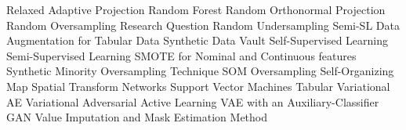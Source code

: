 {{\begin{acronym}
              {Relaxed Adaptive Projection}
               {Random Forest}
              {Random Orthonormal Projection}
              {Random Oversampling}
               {Research Question}
              {Random Undersampling}
             {Semi-SL Data Augmentation for Tabular Data}
              {Synthetic Data Vault}
          {Self-Supervised Learning}
          {Semi-Supervised Learning}
          {SMOTE for Nominal and Continuous features}
            {Synthetic Minority Oversampling Technique}
             {SOM Oversampling}
              {Self-Organizing Map}
              {Spatial Transform Networks}
              {Support Vector Machines}
             {Tabular Variational AE}
             {Variational Adversarial Active Learning}
         {VAE with an Auxiliary-Classifier GAN}
             {Value Imputation and Mask Estimation Method}
\end{acronym}
}
\pagebreak
}

